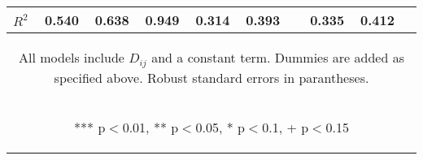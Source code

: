 \begin{center}
\begin{tabular}{lccccccccc}
 $R^2$ & 0.540 & 0.638 & 0.949 & 0.314 & 0.393 &  & 0.335 & 0.412 &  \\ \hline
\multicolumn{10}{c}{\begin{footnotesize} All models include $ D_{ij}$ and a constant term. Dummies are added as specified above. Robust standard errors in parantheses.\end{footnotesize}} \\
\multicolumn{10}{c}{\begin{footnotesize} *** p$<$0.01, ** p$<$0.05, * p$<$0.1, + p$<$0.15\end{footnotesize}} \\
\end{tabular}
\end{center}
